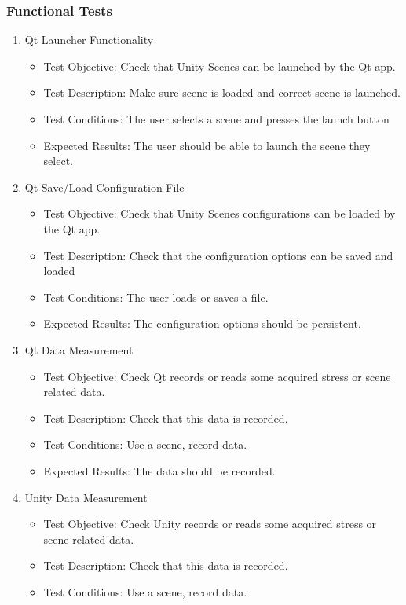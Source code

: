 \documentclass[a4paper,10pt]{article}
\begin{document}
\subsubsection{Functional Tests}
\begin{enumerate}
    \item  Qt Launcher Functionality
    \begin{itemize}
	\item Test Objective: Check that Unity Scenes can be launched by the Qt app.
	\item Test Description: Make sure scene is loaded and correct scene is launched.
	\item Test Conditions: The user selects a scene and presses the launch button
	\item Expected Results: The user should be able to launch the scene they select.
    \end{itemize}
     \item  Qt Save/Load Configuration File
    \begin{itemize}
	\item Test Objective: Check that Unity Scenes configurations can be loaded by the Qt app.
	\item Test Description: Check that the configuration options can be saved and loaded
	\item Test Conditions: The user loads or saves a file. 
	\item Expected Results: The configuration options should be persistent.
    \end{itemize}
     \item  Qt Data Measurement
     \begin{itemize}
	\item Test Objective: Check Qt records or reads some acquired stress or scene related data.
	\item Test Description: Check that this data is recorded.
	\item Test Conditions: Use a scene, record data.
	\item Expected Results: The data should  be recorded.
    \end{itemize}
    \item  Unity Data Measurement
     \begin{itemize}
	\item Test Objective: Check Unity records or reads some acquired stress or scene related data.
	\item Test Description: Check that this data is recorded.
	\item Test Conditions: Use a scene, record data.

\end{itemize}
\end{enumerate}
\end{document}
